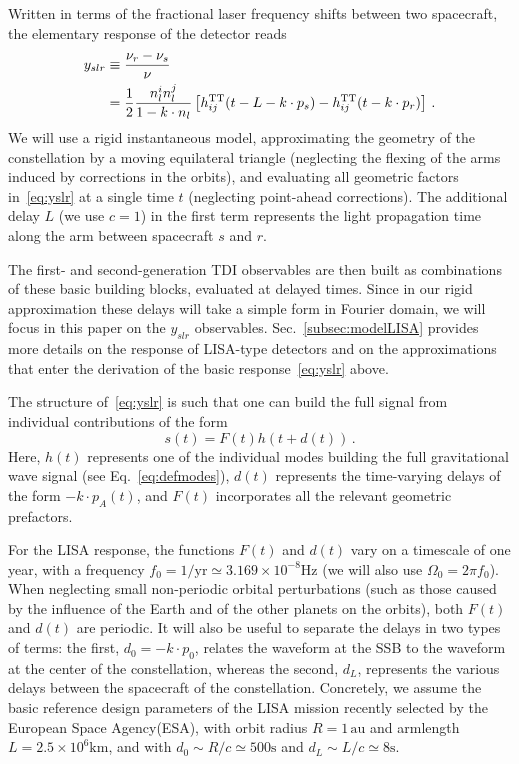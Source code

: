 \documentclass[aps,showpacs,twocolumn,
prd,superscriptaddress,nofootinbib]{revtex4-1}
\newcommand{\be}{\begin{equation}}
\newcommand{\ee}{\end{equation}}
\newcommand{\nn}{\nonumber}
\newcommand{\hatk}{k}
\begin{document}
Written in terms of the fractional laser frequency shifts between two spacecraft, the elementary response of the detector reads~\cite{EW75, RCP04, Vallisneri04}
\begin{align}\label{eq:yslr}
	y_{slr} &\equiv \frac{\nu_{r} - \nu_{s}}{\nu} \nn\\
	&= \frac{1}{2} \frac{n_{l}^{i}n_{l}^{j}}{1 - \hatk\cdot n_{l}} \left[ h_{ij}^{\rm TT}(t - L - \hatk\cdot p_{s}) - h_{ij}^{\rm TT}(t - \hatk\cdot p_{r}) \right] \,.
\end{align}
We will use a rigid instantaneous model, approximating the geometry of the constellation by a moving equilateral triangle (neglecting the flexing of the arms induced by corrections in the orbits), and evaluating all geometric factors in~\eqref{eq:yslr} at a single time $t$ (neglecting point-ahead corrections). The additional delay $L$ (we use $c=1$) in the first term represents the light propagation time along the arm between spacecraft $s$ and $r$.

The first- and second-generation TDI observables are then built as combinations of these basic building blocks, evaluated at delayed times. Since in our rigid approximation these delays will take a simple form in Fourier domain, we will focus in this paper on the $y_{slr}$ observables. Sec.~\ref{subsec:modelLISA} provides more details on the response of LISA-type detectors and on the approximations that enter the derivation of the basic response~\eqref{eq:yslr} above.

The structure of~\eqref{eq:yslr} is such that one can build the full signal from individual contributions of the form
\be
	s(t) = F(t) h(t + d(t)) \,.
\ee
Here, $h(t)$ represents one of the individual modes building the full gravitational wave signal (see Eq.~\eqref{eq:defmodes}), $d(t)$ represents the time-varying delays of the form $-\hatk\cdot p_{A}(t)$, and $F(t)$ incorporates all the relevant geometric prefactors.

For the LISA response, the functions $F(t)$ and $d(t)$ vary on a timescale of one year, with a frequency $f_{0} = 1/\mathrm{yr} \simeq 3.169\times10^{-8} \mathrm{Hz}$ (we will also use $\Omega_{0} = 2\pi f_{0}$). When neglecting small non-periodic orbital perturbations (such as those caused by the influence of the Earth and of the other planets on the orbits), both $F(t)$ and $d(t)$ are periodic. It will also be useful to separate the delays in two types of terms: the first, $d_{0} = -\hatk\cdot p_{0}$, relates the waveform at the SSB to the waveform at the center of the constellation, whereas the second, $d_{L}$, represents the various delays between the spacecraft of the constellation. Concretely, we assume the basic reference design parameters of the LISA mission\cite{LISA17} recently selected by the European Space Agency(ESA), with orbit radius $R=1\,\mathrm{au}$ and armlength $L=2.5\times10^{6}\mathrm{km}$, and with $d_{0} \sim R/c \simeq 500\mathrm{s}$ and $d_{L} \sim L/c \simeq 8\mathrm{s}$.
\end{document}

